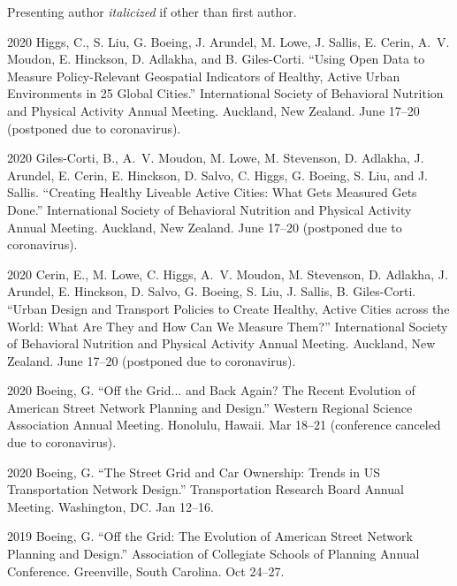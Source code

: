 \documentclass[12pt,letterpaper]{report}
\begin{document}
    Presenting author \textit{italicized} if other than first author.\bigskip

    \begin{tablist}
    	
    	\item[2020] \tab Higgs, C.,  S. Liu, G. Boeing, J. Arundel, M. Lowe, J. Sallis, E. Cerin, A.~V. Moudon, E. Hinckson, D. Adlakha, and B. Giles-Corti. \enquote{Using Open Data to Measure Policy-Relevant Geospatial Indicators of Healthy, Active Urban Environments in 25 Global Cities.} International Society of Behavioral Nutrition and Physical Activity Annual Meeting. Auckland, New Zealand. June 17--20 (postponed due to coronavirus).
    	
    	\item[2020] \tab Giles-Corti, B.,  A.~V. Moudon, M. Lowe, M. Stevenson, D. Adlakha, J. Arundel, E. Cerin, E. Hinckson, D. Salvo, C. Higgs, G. Boeing, S. Liu, and J. Sallis. \enquote{Creating Healthy Liveable Active Cities: What Gets Measured Gets Done.} International Society of Behavioral Nutrition and Physical Activity Annual Meeting. Auckland, New Zealand. June 17--20 (postponed due to coronavirus).
    	
    	\item[2020] \tab Cerin, E., M. Lowe, C. Higgs, A.~V. Moudon, M. Stevenson, D. Adlakha, J. Arundel, E. Hinckson, D. Salvo, G. Boeing, S. Liu, J. Sallis, B. Giles-Corti. \enquote{Urban Design and Transport Policies to Create Healthy, Active Cities across the World: What Are They and How Can We Measure Them?} International Society of Behavioral Nutrition and Physical Activity Annual Meeting. Auckland, New Zealand. June 17--20 (postponed due to coronavirus).
    	
    	\item[2020] \tab Boeing, G. \enquote{Off the Grid... and Back Again? The Recent Evolution of American Street Network Planning and Design.} Western Regional Science Association Annual Meeting. Honolulu, Hawaii. Mar 18--21 (conference canceled due to coronavirus).
    	
    	\item[2020] \tab Boeing, G. \enquote{The Street Grid and Car Ownership: Trends in US Transportation Network Design.} Transportation Research Board Annual Meeting. Washington, DC. Jan 12--16.

        \item[2019] \tab Boeing, G. \enquote{Off the Grid: The Evolution of American Street Network Planning and Design.} Association of Collegiate Schools of Planning Annual Conference. Greenville, South Carolina. Oct 24--27.


\end{tablist}
\end{document}
